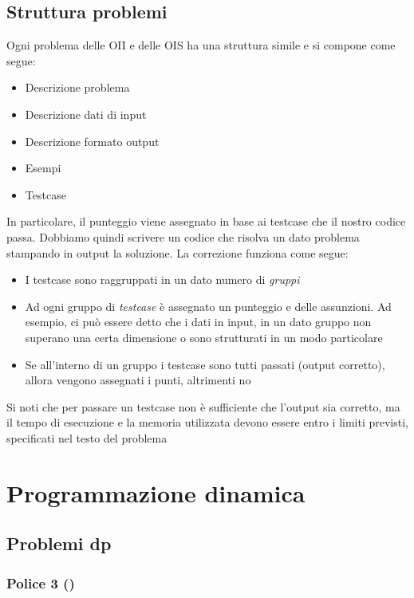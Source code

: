 \subsection{Struttura problemi}
Ogni problema delle OII e delle OIS ha una struttura simile e si compone come segue:
\begin{itemize}
	\item Descrizione problema
	\item Descrizione dati di input
	\item Descrizione formato output
	\item Esempi
	\item Testcase
\end{itemize}
In particolare, il punteggio viene assegnato in base ai testcase che il nostro codice passa. Dobbiamo quindi scrivere un codice che risolva un dato problema stampando in output la soluzione. La correzione funziona come segue:
\begin{itemize}
	\item I testcase sono raggruppati in un dato numero di \textit{gruppi}
	\item Ad ogni gruppo di \textit{testcase} è assegnato un punteggio e delle assunzioni. Ad esempio, ci può essere detto che i dati in input, in un dato gruppo non superano una certa dimensione o sono strutturati in un modo particolare
	\item Se all'interno di un gruppo i testcase sono tutti passati (output corretto), allora vengono assegnati i punti, altrimenti no
\end{itemize}
Si noti che per passare un testcase non è sufficiente che l'output sia corretto, ma il tempo di esecuzione e la memoria utilizzata devono essere entro i limiti previsti, specificati nel testo del problema

\section{Programmazione dinamica}

\subsection{Problemi dp}

\subsubsection{Police 3 ()}



